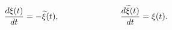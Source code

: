 \begin{equation}
\label{fermiondynamics}
\frac{d\xi(t)}{dt} = -{\widetilde \xi}(t),
\hspace{1.0in}
\frac{d{\widetilde \xi}(t)}{dt} = \xi(t).
\end{equation}


